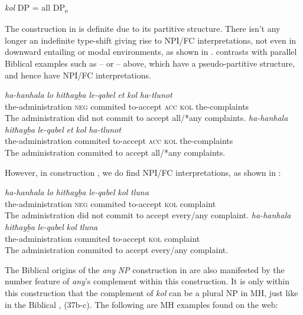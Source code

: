 \documentclass[output=paper]{langsci/langscibook}
\begin{document}
\ea%
    \label{ex:doron:57}
    \textit{kol} DP  =  all  DP\textsubscript{e}
\z

The construction in  is definite due to its partitive structure. There isn’t any longer an indefinite type-shift  giving rise to NPI/FC interpretations, not even in downward entailing or modal environments, as shown in .   contrasts with parallel Biblical examples such as  –  or  –  above, which have a pseudo-partitive structure, and hence have NPI/FC interpretations. 

\ea%
    \label{ex:doron:58}
    \ea
    \gll \textit{ha-hanhala}            \textit{lo}     \textit{hitħayḇa}   \textit{le-qabel}     \textit{et}    \textit{kol}    \textit{ha-tlunot} \\
         the-administration \textsc{neg} commited  to-accept  \textsc{acc} \textsc{kol}  the-complaints  \\
    \glt The administration did not commit to accept all/*any complaints. 
    \ex  
    \gll \textit{ha-hanhala}            \textit{hitħayḇa}    \textit{le-qabel}     \textit{et}    \textit{kol}   \textit{ha-tlunot}           \\
         the-administration commited  to-accept  \textsc{acc} \textsc{kol}  the-complaints  \\
    \glt The administration commited to accept all/*any complaints. 
    \z
\z

However, in construction , we do find NPI/FC interpretations, as shown in :

\ea%
    \label{ex:doron:59}
    \ea
    \gll \textit{ha-hanhala}            \textit{lo}     \textit{hitħayḇa}   \textit{le-qabel}    \textit{kol}    \textit{tluna} \\
         the-administration \textsc{neg} commited  to-accept  \textsc{kol}  complaint   \\
    \glt The administration did not commit to accept every/any complaint.   
    \ex  
    \gll \textit{ha-hanhala}             \textit{hitħayḇa}    \textit{le-qabel}    \textit{kol}    \textit{tluna}          \\
         the-administration  commited  to-accept  \textsc{kol}  complaint  \\
    \glt The administration commited to accept every/any complaint.       
    \z
\z

The Biblical origins of the \textit{any} \textit{NP} construction in  are also manifested by the number feature of \textit{any}’s complement within this construction. It is only within this construction that the complement of \textit{kol} can be a plural NP in MH, just like in the Biblical , (37b-c). The following are MH examples found on the web:~
\end{document}

